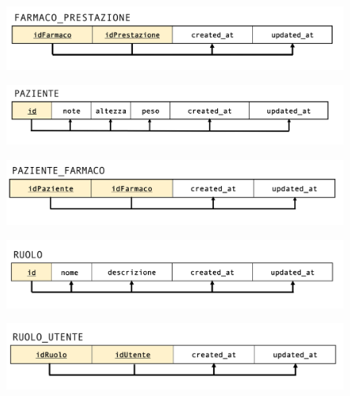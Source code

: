 \documentclass[paper=a4, fontsize=11pt,x11names]{report}
\begin{document}
\begin{figure}[H]
\begin{center}
\includegraphics[scale=0.35]{immagini_normalizzazione/farmaco_prestazione}
\end{center}
\end{figure}

\begin{figure}[H]
\begin{center}
\includegraphics[scale=0.38]{immagini_normalizzazione/paziente}
\end{center}
\end{figure}

\begin{figure}[H]
\begin{center}
\includegraphics[scale=0.35]{immagini_normalizzazione/paziente_farmaco}
\end{center}
\end{figure}

\begin{figure}[H]
\begin{center}
\includegraphics[scale=0.28]{immagini_normalizzazione/permessi}
\end{center}
\end{figure}

\begin{figure}[H]
\begin{center}
\includegraphics[scale=0.28]{immagini_normalizzazione/permessi_utente}
\end{center}
\end{figure}
\end{document}
